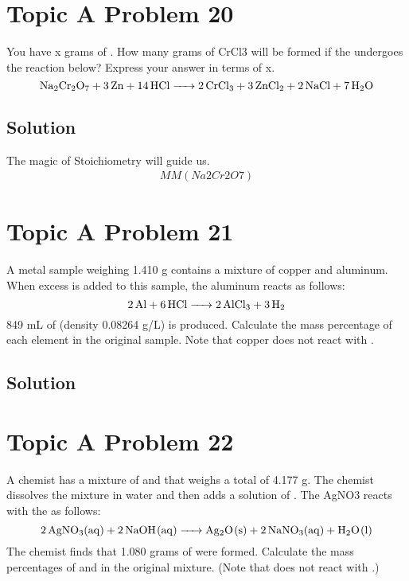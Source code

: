 \documentclass[10pt]{article}
\begin{document}
    \pagebreak
    \section{Topic A Problem 20}
        You have x grams of . 
        How many grams of CrCl3 will be formed if the  undergoes the reaction below? 
        Express your answer in terms of x.
        \begin{equation}
            \ce{Na2Cr2O7 + 3 Zn + 14 HCl -> 2 CrCl3 + 3 ZnCl2 + 2 NaCl + 7 H2O}
        \end{equation}

        \subsection{Solution}
            The magic of Stoichiometry will guide us.
            \begin{gather}
                MM(Na2Cr2O7)
            \end{gather}

    \pagebreak
    \section{Topic A Problem 21}
        A metal sample weighing 1.410 g contains a mixture of copper and aluminum. 
        When excess  is added to this sample, the aluminum reacts as follows:
        \begin{equation}
            \ce{2 Al + 6 HCl -> 2 AlCl3 + 3 H2}
        \end{equation}
        849 mL of  (density 0.08264 g/L) is produced. 
        Calculate the mass percentage of each element in the original sample. 
        Note that copper does not react with .

        \subsection{Solution}

    \pagebreak
    \section{Topic A Problem 22}
        A chemist has a mixture of  and  that weighs a total of 4.177 g. 
        The chemist dissolves the mixture in water and then adds a solution of . 
        The AgNO3 reacts with the  as follows:
        \begin{equation}
            \ce{2 AgNO3(aq) + 2 NaOH(aq) -> Ag2O(s) + 2 NaNO3(aq) + H2O(l)}
        \end{equation}
        The chemist finds that 1.080 grams of  were formed. 
        Calculate the mass percentages of  and  in the original mixture. 
        (Note that  does not react with .)
\end{document}
